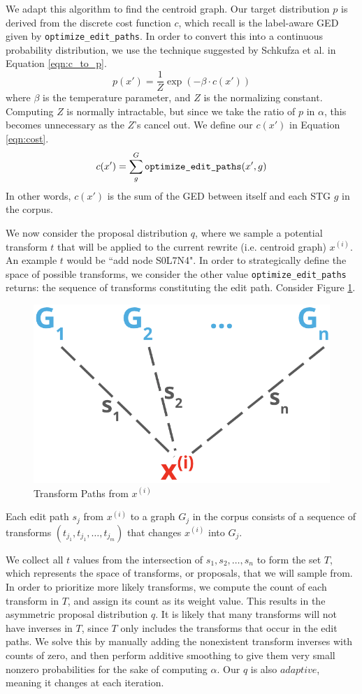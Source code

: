 \documentclass{article}
\begin{document}
We adapt this algorithm to find the centroid graph. Our target distribution $p$ is derived from the discrete cost function $c$, which recall is the label-aware GED given by \verb!optimize_edit_paths!. In order to convert this into a continuous probability distribution, we use the technique suggested by Schkufza et al. \cite{cacm} in Equation \ref{eqn:c_to_p}.
\begin{equation}
p(x')=\frac{1}{Z}\exp(-\beta\cdot c(x'))
\label{eqn:c_to_p}
\end{equation}
where $\beta$ is the temperature parameter, and $Z$ is the normalizing constant. Computing $Z$ is normally intractable, but since we take the ratio of $p$ in $\alpha$, this becomes unnecessary as the $Z$'s cancel out. We define our $c(x')$ in Equation \ref{eqn:cost}.
\begin{equation}
c(x') = \sum_g^G \verb!optimize_edit_paths!(x', g)
\label{eqn:cost}
\end{equation}
In other words, $c(x')$ is the sum of the GED between itself and each STG $g$ in the corpus.

We now consider the proposal distribution $q$, where we sample a potential transform $t$ that will be applied to the current rewrite (i.e. centroid graph) $x^{(i)}$. An example $t$ would be ``add node S0L7N4". In order to strategically define the space of possible transforms, we consider the other value \verb!optimize_edit_paths! returns: the sequence of transforms constituting the edit path. Consider Figure \ref{fig:proposal_dist}. 
 \begin{figure}[h!]
  \centering
  \includegraphics[width=0.4\linewidth]{figs/proposal_dist}
  \caption{Transform Paths from $x^{(i)}$}
  \label{fig:proposal_dist}
\end{figure}
Each edit path $s_j$ from $x^{(i)}$ to a graph $G_j$ in the corpus consists of a sequence of transforms $(t_{j_1}, t_{j_1}, \ldots, t_{j_m})$ that changes $x^{(i)}$ into $G_j$. 

We collect all $t$ values from the intersection of $s_1, s_2, \ldots, s_n$ to form the set $T$, which represents the space of transforms, or proposals, that we will sample from. In order to prioritize more likely transforms, we compute the count of each transform in $T$, and assign its count as its weight value. This results in the asymmetric proposal distribution $q$. It is likely that many transforms will not have inverses in $T$, since $T$ only includes the transforms that occur in the edit paths. We solve this by manually adding the nonexistent transform inverses with counts of zero, and then perform additive smoothing to give them very small nonzero probabilities for the sake of computing $\alpha$. Our $q$ is also $adaptive$, meaning it changes at each iteration. 
\end{document}
